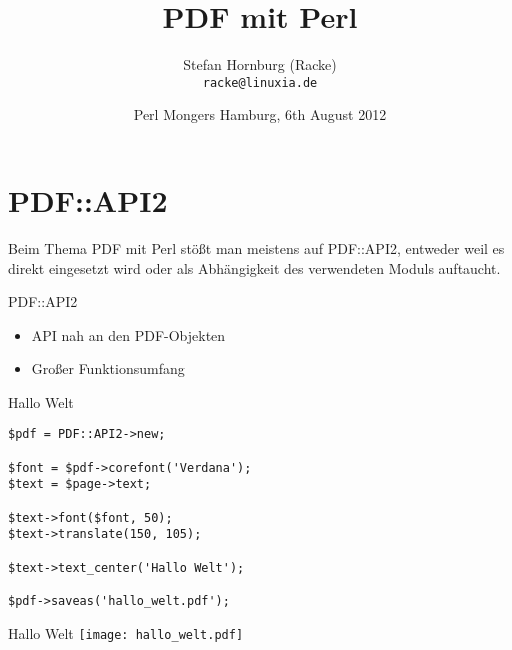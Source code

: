 \usepackage[utf8]{inputenc}
\usepackage[T1]{fontenc}
\usepackage{mathptmx}
\usepackage[scaled=.90]{helvet}
\usepackage{courier}

\usepackage{beamerthemesplit}
\usepackage{verbatim}
\usepackage{hyperref}
\usepackage{graphicx}

\usepackage{listings}
\lstset{language=Perl,basicstyle=\footnotesize,tabsize=3,showstringspaces=false}

\title{PDF mit Perl}
\author[racke]{Stefan Hornburg (Racke)\\ \texttt{racke@linuxia.de}}
\date[]{Perl Mongers Hamburg, 6th August 2012}


\maketitle{}

\begin{frame}
  \titlepage
\end{frame}

\tableofcontents

\section{PDF::API2}

Beim Thema PDF mit Perl stößt man meistens auf PDF::API2,
entweder weil es direkt eingesetzt wird oder als Abhängigkeit
des verwendeten Moduls auftaucht.

\begin{frame}{PDF::API2}
\begin{itemize}
\item API nah an den PDF-Objekten
\item Großer Funktionsumfang
\end{itemize}
\end{frame}

\begin{frame}[fragile]{Hallo Welt}
\begin{lstlisting}
$pdf = PDF::API2->new;

$font = $pdf->corefont('Verdana');
$text = $page->text;

$text->font($font, 50);
$text->translate(150, 105);

$text->text_center('Hallo Welt');

$pdf->saveas('hallo_welt.pdf');
\end{lstlisting}
\end{frame}

\begin{frame}{Hallo Welt}
\texttt{[image: hallo\_welt.pdf]}
\end{frame}

